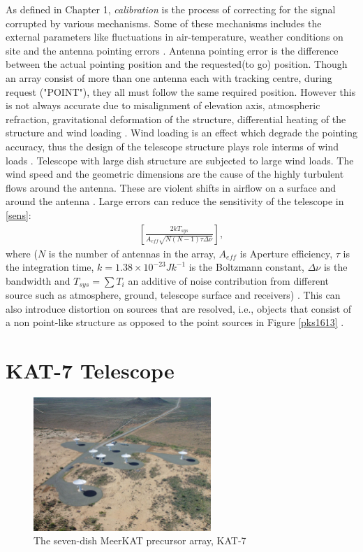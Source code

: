 As defined in Chapter 1, \textit{calibration} is the process of correcting for the signal corrupted by various mechanisms. Some of these mechanisms includes the external parameters like fluctuations in air-temperature, weather conditions on site and the antenna pointing errors \citep{taylor1999synthesis}. Antenna pointing error is the difference between the actual pointing position and the requested(to go) position. Though an array consist of more than one antenna each with tracking centre, during request ("POINT"),  they all must follow the same required position. However this is not always accurate due to misalignment of elevation axis, atmospheric refraction, gravitational deformation of the structure, differential heating of the structure and wind loading \citep{taylor1999synthesis}. Wind loading is an effect which degrade the pointing accuracy, thus the design of the telescope structure plays  role interms of wind loads \citep{smithdynamic}. Telescope with large dish structure are subjected to large wind loads. The wind speed and the geometric dimensions are the cause of the highly turbulent flows around the antenna. These are violent shifts in airflow on a surface and around the antenna \citep{upnere2012characterization}. Large errors can reduce the sensitivity of the telescope in \ref{sens}:
\begin{align}
\left[\frac{2kT_{sys}}{A_{eff}\sqrt{N(N-1)\tau \Delta \nu}}\right]
\label{sens},
\end{align}
 where ($N$ is the number of antennas in the array,  $A_{eff}$ is Aperture efficiency, $\tau$ is the integration time, $k=1.38\times 10^{-23}Jk^{-1}$ is the Boltzmann constant, $\Delta \nu$ is the bandwidth and $T_{sys}=\sum T_{i}$ an additive of noise contribution from different source such as atmosphere, ground, telescope surface and receivers) \citep{wilson2013tools}. This can also introduce distortion on sources that are resolved, i.e., objects that consist of a non point-like structure as opposed to the point sources in Figure \ref{pks1613} \citep{Calibration}. 



\section{KAT-7 Telescope}
\label{kat7}

\begin{figure}[H]
  \centering
    \includegraphics[width=0.6\textwidth]{images/K7.png}
    \caption{The seven-dish MeerKAT precursor array, KAT-7 \citep{carignan2013kat}}
  \label{images/kat7.png}
\end{figure}

